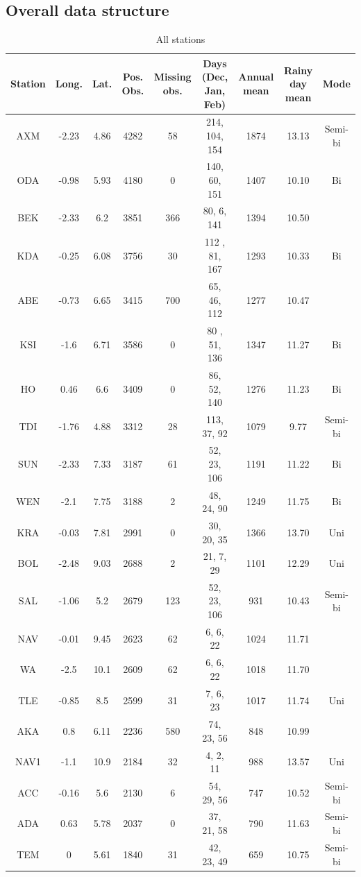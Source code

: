 \documentclass{article}
\begin{document}
	\subsection{Overall data structure}
	
	\begin{table}[H]
		\centering
		\begin{tabular}{| c | c | c | c | c| c| c | c | c |}
			\hline
			Station & Long. & Lat. & Pos. Obs. & Missing obs. & Days (Dec, Jan, Feb) & Annual mean & Rainy day mean & Mode \\
			\hline
			AXM & -2.23 & 4.86 & 4282 & 58 & 214, 104, 154 & 1874 & 13.13 &  Semi-bi \\
			ODA & -0.98 & 5.93 & 4180 & 0 & 140, 60, 151 & 1407 & 10.10 & Bi \\
			BEK & -2.33 & 6.2 & 3851 & 366 & 80, 6, 141 & 1394 & 10.50 & \\
			KDA & -0.25 & 6.08 & 3756 & 30 & 112 , 81, 167 & 1293 & 10.33 & Bi\\
			ABE & -0.73 & 6.65 & 3415 & 700& 65, 46, 112 &1277 & 10.47 &  \\
			KSI & -1.6 & 6.71 & 3586 & 0 & 80 , 51, 136 & 1347 & 11.27 & Bi \\
			HO & 0.46 & 6.6 & 3409 & 0& 86, 52, 140 & 1276 & 11.23& Bi \\
			TDI & -1.76 & 4.88 & 3312 & 28 & 113, 37, 92 & 1079 & 9.77 & Semi-bi\\
			SUN & -2.33 & 7.33 & 3187 & 61 & 52, 23, 106 & 1191 & 11.22 & Bi\\
			WEN & -2.1 & 7.75 & 3188 & 2& 48, 24, 90 & 1249 & 11.75& Bi \\
			KRA & -0.03 & 7.81 & 2991 & 0 & 30, 20, 35 & 1366 & 13.70 & Uni\\
			BOL & -2.48 & 9.03 & 2688 & 2 &  21, 7, 29 & 1101 & 12.29 & Uni\\
			SAL & -1.06 & 5.2 & 2679 & 123 & 52, 23, 106 & 931 & 10.43 & Semi-bi\\
			NAV & -0.01 & 9.45 & 2623 & 62& 6, 6, 22 & 1024 & 11.71 & \\
			WA & -2.5 & 10.1 & 2609 & 62 & 6, 6, 22 & 1018 & 11.70 &  \\
			TLE & -0.85 & 8.5 & 2599 & 31 & 7, 6, 23 & 1017 & 11.74 & Uni\\
			AKA & 0.8 & 6.11 & 2236 & 580 & 74, 23, 56 & 848 & 10.99 & \\
			NAV1 & -1.1 & 10.9 & 2184 & 32 & 4, 2, 11 & 988 & 13.57 & Uni\\
			ACC & -0.16 & 5.6 & 2130 & 6 & 54, 29, 56 & 747 & 10.52 & Semi-bi \\
			ADA & 0.63 & 5.78 & 2037 & 0 & 37, 21, 58 & 790 & 11.63 & Semi-bi\\
			TEM & 0 & 5.61 & 1840 & 31 & 42, 23, 49 & 659 & 10.75 & Semi-bi \\
			\hline
		\end{tabular}
		\caption{All stations}
		\label{Tstations}
	\end{table}
\end{document}
